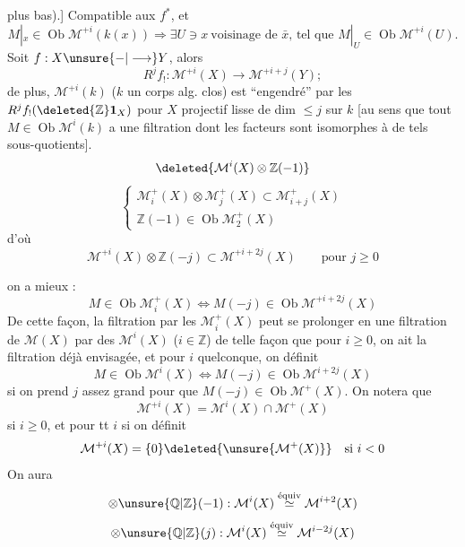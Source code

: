 plus bas).]
Compatible aux
$f^*$, et 
\[
M|_x\in\operatorname{Ob}\mathcal{M}^{+i}(k(x))
\Longrightarrow
\exists U\ni x\ \text{voisinage de $\bar{x}$, tel que }
M|_U\in\operatorname{Ob}\mathcal{M}^{+i}(U).
\]
Soit $f:X\unsure{-|\longrightarrow}Y$,
alors
\[
R^jf_!:\mathcal{M}^{+i}(X)\longrightarrow \mathcal{M}^{+i+j}(Y);
\]
de plus, $\mathcal{M}^{+i}(k)$ ($k$ un corps alg. clos)
est ``engendré'' par les 
$R^jf_!(\deleted{\mathbb{Z}}\mathbf1_X)$ pour
$X$  projectif lisse de dim $\leq j$ sur $k$
[au sens que tout $M\in\operatorname{Ob}\mathcal{M}^i(k)$ a une
filtration dont les facteurs sont isomorphes
à de tels sous-quotients].
\[
\deleted{\mathcal{M}^i(X)\otimes\mathbb{Z}(-1)}
\]
\[
\left\{
\begin{array}{l}
\mathcal{M}_i^+(X)\otimes \mathcal{M}_j^+(X)\subset \mathcal{M}_{i+j}^+(X)\\
\mathbb{Z}(-1)\in\operatorname{Ob}\mathcal{M}_2^+(X)
\end{array}\right.
\]
d'où
\[
\mathcal{M}^{+i}(X)\otimes\mathbb{Z}(-j)\subset \mathcal{M}^{+i+2j}(X)
\qquad\text{pour }j\geq0
\]

on a mieux :
\[
M\in\operatorname{Ob}\mathcal{M}_i^+(X)\Longleftrightarrow
M(-j)\in\operatorname{Ob}\mathcal{M}^{+i+2j}(X)
\]
De cette façon, la filtration  par les
$\mathcal{M}_i^+(X)$  peut se prolonger en une filtration
de $\mathcal{M}(X)$ par des $\mathcal{M}^i(X)$ ($i\in\mathbb{Z}$) de
telle façon que pour $i\geq0$, on ait la filtration
déjà  envisagée, et pour $i$ quelconque,
on définit
\[
M\in\operatorname{Ob}\mathcal{M}^i(X)\Longleftrightarrow
M(-j)\in\operatorname{Ob}\mathcal{M}^{i+2j}(X)
\]
si on prend $j$ assez grand pour que
$M(-j)\in\operatorname{Ob}\mathcal{M}^+(X)$. On notera que
\[
\mathcal{M}^{+i}(X)=\mathcal{M}^i(X)\cap \mathcal{M}^+(X)
\]
si $i\geq0$, et pour tt $i$ si on définit
\[
\mathcal{M}^{+i}(X)=\{0\}\deleted{\unsure{\mathcal{M}^+(X)}}\quad\text{si }i<0
\]
On aura
\[
\otimes\unsure{\mathbb{Q}|\mathbb{Z}}(-1):
\mathcal{M}^i(X)\overset{\text{équiv}}{\simeq}\mathcal{M}^{i+2}(X)
\]
\[
\otimes\unsure{\mathbb{Q}|\mathbb{Z}}(j):
\mathcal{M}^i(X)\overset{\text{équiv}}{\simeq}\mathcal{M}^{i-2j}(X)
\]


